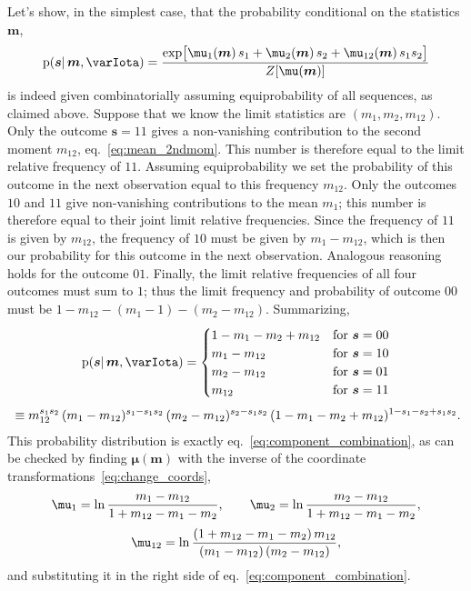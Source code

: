 \documentclass[\ifafour a4paper,12pt,\else a5paper,10pt,\fi%
onecolumn,oneside,article,%
british%
]{memoir}
\theoremstyle{remark}
\theoremstyle{innote}
\newcommand*{\pf}{\mathrm{p}}%
\renewcommand*{\|}{\mathpunct{|}}
\newcommand*{\eqn}{eq.}%
\newcommand*{\yI}{\varIota}
\newcommand*{\ys}{\bm{s}}
\newcommand*{\yso}[1]{\ys^{(#1)}}
\newcommand*{\la}{\mu_{12}}
\newcommand*{\yth}{\bm{\mu}}
\newcommand*{\yt}{\bm{m}}
\newcommand*{\yl}{m_{12}}
\begin{document}
Let's show, in the simplest case, that the probability conditional on
the statistics $\yt$,
\begin{equation}
  \label{eq:component_combination}
  \pf(\ys \|\yt, \yI )
  =
  \frac{  \exp\bigl[
    \mu_1(\yt)\, s_1 + \mu_2(\yt)\, s_2 + \la(\yt)\, s_1 s_2
    \bigr] }{Z[\yth(\yt)]}
\end{equation}
is indeed given combinatorially assuming equiprobability of all sequences,
as claimed above. Suppose that we know the limit statistics are
$(m_1, m_2, \yl)$. Only the outcome $\ys=11$ gives a non-vanishing
contribution to the second moment $\yl$, \eqn~\eqref{eq:mean_2ndmom}. This
number is therefore equal to the limit relative frequency of $11$. Assuming
equiprobability we set the probability of this outcome in the next
observation equal to this frequency $\yl$. Only the outcomes $10$ and $11$
give non-vanishing contributions to the mean $m_1$; this number is
therefore equal to their joint limit relative frequencies. Since the
frequency of $11$ is given by $\yl$, the frequency of $10$ must be given by
$m_1-\yl$, which is then our probability for this outcome in the next
observation. Analogous reasoning holds for the outcome $01$. Finally, the
limit relative frequencies of all four outcomes must sum to $1$; thus the
limit frequency and probability of outcome $00$ must be
$1-\yl-(m_1-1)-(m_2-\yl)$. Summarizing,
\begin{multline}
  \label{eq:prob_outcome_from_statistics}
  \pf(\ys \| \yt,\yI) =
  \begin{cases}
    1-m_1-m_2+\yl &\text{for } \ys=00\\
    m_1-\yl &\text{for } \ys=10\\
    m_2-\yl &\text{for } \ys=01\\
    \yl &\text{for } \ys=11
  \end{cases}
  \\[\jot]
  {}\equiv
    \yl^{s_1 s_2}\,
  (m_1-\yl)^{s_1-s_1 s_2}\,
  (m_2-\yl)^{s_2-s_1 s_2}\,
  (1-m_1-m_2+\yl)^{1-s_1-s_2+s_1 s_2}.
\end{multline}
This probability distribution is exactly
\eqn~\eqref{eq:component_combination}, as can be checked by finding
$\yth(\yt)$ with the inverse of the coordinate
transformations~\eqref{eq:change_coords},
\begin{equation}
  \label{eq:inverse_tranf_coord}
  \begin{gathered}
    \mu_1 =\ln\frac{m_1-\yl}{1+\yl-m_1-m_2},\qquad
    \mu_2 =\ln\frac{m_2-\yl}{1+\yl-m_1-m_2},\\[\jot]
\la =\ln\frac{(1+\yl-m_1-m_2)\,\yl}{(m_1-\yl)\,(m_2-\yl)},
\end{gathered}
\end{equation}
and substituting it in the right side of
\eqn~\eqref{eq:component_combination}.
\end{document}
